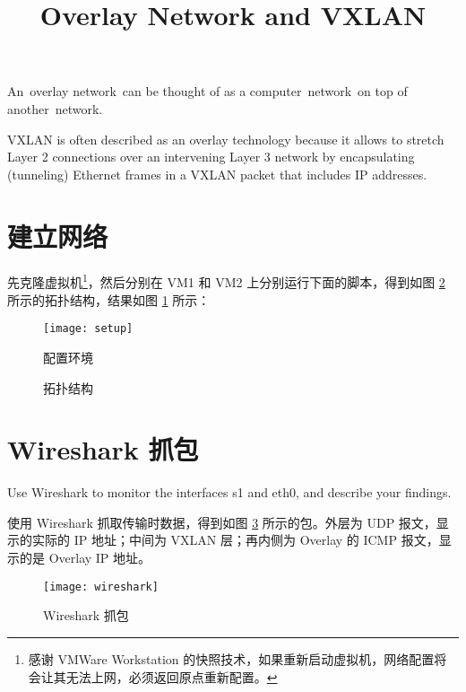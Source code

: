 \endofdump
{}

    \title{Overlay Network and VXLAN}
    \maketitle
    \tableofcontents
    \vfill
    An overlay network can be thought of as a computer network on top of another network. 

    VXLAN is often described as an overlay technology because it allows to stretch Layer 2 connections over an intervening Layer 3 network by encapsulating (tunneling) Ethernet frames in a VXLAN packet that includes IP addresses.
    \vfill
    \clearpage
    \section{建立网络}

    先克隆虚拟机\footnote{感谢 VMWare Workstation 的快照技术，如果重新启动虚拟机，网络配置将会让其无法上网，必须返回原点重新配置。}，然后分别在 VM1 和 VM2 上分别运行下面的脚本，得到如图 \ref{fig:topo} 所示的拓扑结构，结果如图 \ref{fig:setup} 所示：


    \begin{figure}[H]
        \centering
        \texttt{[image: setup]}
        \caption{配置环境}\label{fig:setup}
    \end{figure}

    \begin{figure}[H]
        \centering
        
        \caption{拓扑结构}\label{fig:topo}
    \end{figure}

    \section{Wireshark 抓包}
    Use Wireshark to monitor the interfaces s1 and eth0, and describe your findings.

    使用 Wireshark 抓取传输时数据，得到如图 \ref{fig:wireshark} 所示的包。外层为 UDP 报文，显示的实际的 IP 地址；中间为 VXLAN 层；再内侧为 Overlay 的 ICMP 报文，显示的是 Overlay IP 地址。

    \begin{figure}[H]
        \centering
        \texttt{[image: wireshark]}
        \caption{Wireshark 抓包}\label{fig:wireshark}
    \end{figure}

